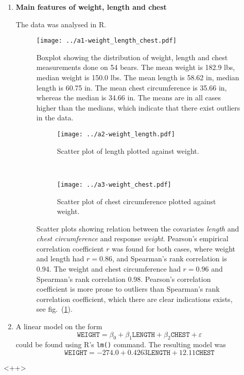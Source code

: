 \documentclass[a4paper,11pt]{article}
\begin{document}
\begin{enumerate}[label=\alph*)]
    \item \textbf{Main features of weight, length and chest} 

        The data was analysed in R.

        \begin{figure}[htb]
            \centering
            \texttt{[image: ../a1-weight\_length\_chest.pdf]}
            \caption{Boxplot showing the distribution of weight, length and chest measurements done on 54 bears. The mean weight is 182.9 lbs, median weight is 150.0 lbs. The mean length is 58.62 in, median length is 60.75 in. The mean chest circumference is 35.66 in, whereas the median is 34.66 in. The means are in all cases higher than the medians, which indicate that there exist outliers in the data.}
            \label{fig:a1}
        \end{figure}

        \begin{figure}[htb]
            \centering
            \begin{subfigure}[b]{0.45\textwidth}
                \texttt{[image: ../a2-weight\_length.pdf]}
                \label{fig:a2a}
                \caption{Scatter plot of length plotted against weight.}
            \end{subfigure}
            ~
            \begin{subfigure}[b]{0.45\textwidth}
                \texttt{[image: ../a3-weight\_chest.pdf]}
                \label{fig:a2b}
                \caption{Scatter plot of chest circumference plotted against weight.}
            \end{subfigure}
            \caption{Scatter plots showing relation between the covariates \textit{length} and \textit{chest circumference} and response \textit{weight}. Pearson's empirical correlation coefficient $r$ was found for both cases, where weight and length had $r = 0.86$, and Spearman's rank correlation is 0.94. The weight and chest circumference had $r = 0.96$ and Spearman's rank correlation 0.98. Pearson's correlation coefficient is more prone to outliers than Spearman's rank correlation coefficient, which there are clear indications exists, see fig.~(\ref{fig:a1}).  }
            \label{fig:a2}
        \end{figure}

    \item A linear model on the form
        \begin{equation}
        \mathtt{WEIGHT} = \beta_0 + \beta_1 \mathtt{LENGTH} + \beta_2 \mathtt{CHEST} + \varepsilon
            \label{eq:linmod1}
        \end{equation}
        could be found using R's \texttt{lm()} command. The resulting model was
        \begin{equation}
            \mathtt{WEIGHT} = -274.0 + 0.4263 \mathtt{LENGTH} + 12.11 \mathtt{CHEST}
            \label{eq:linmod}
        \end{equation}

\end{enumerate}<++>
\end{document}
